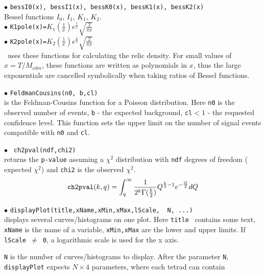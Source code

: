 \documentclass[12pt,a4paper]{article}
\begin{document}
\noindent$\bullet$ \verb|bessI0(x), bessI1(x), bessK0(x), bessK1(x), bessK2(x) |\\
 Bessel functions $I_0$, $I_1$, $K_1$, $K_2$.\\ 

\noindent$\bullet$ \verb|K1pole(x)=|$K_1(\frac{1}{x}) e^\frac{1}{x}
\sqrt{\frac{2}{\pi x}}$  \\
\noindent$\bullet$ \verb|K2pole(x)=|$K_2(\frac{1}{x}) e^\frac{1}{x}
\sqrt{\frac{2}{\pi x}}$   \\
\micro\ uses these functions for calculating the  relic density. For 
small values of $x=T/M_{cdm}$, these functions are written as polynomials in $x$, thus the large exponentials are cancelled symbolically when taking ratios 
 of  Bessel functions.  


\noindent$\bullet$ \verb|FeldmanCousins(n0, b,cl)|\\
is the Feldman-Cousins \cite{Feldman:1997qc}  function for a Poisson distribution.
Here {\tt n0} is the observed number of events, {\tt b} -  the expected background,
\verb|cl|$ < 1 $ - the requested confidence level. This function sets the upper limit on the number 
of signal events compatible with {\tt n0}  and {\tt cl}.

\noindent$\bullet$ \verb| ch2pval(ndf,chi2)|\\ 
returns the {\tt p-value} assuming a $\chi^2$ distribution with  {\tt ndf} degrees
of freedom ( expected  $\chi^2$) and {\tt chi2} is the observed $\chi^2$.  
$$   
{  \verb|ch2pval|(k,q)=\int_q^\infty  \frac{1}{2^k \Gamma(\frac{k}{2})} Q^{\frac{k}{2}-1}
e^{-\frac{Q}{2}} dQ } $$   

\noindent$\bullet$ \verb|displayPlot(title,xName,xMin,xMax,lScale,  N, ...)|\\
displays several  curves/histograms on one plot.  Here {\tt title  } contains some text, {\tt xName} is the name of a variable, 
{\tt xMin,xMax} are the lower and upper limits. If {\tt lScale $\neq$ 0}, a logarithmic scale 
is used for the x axis.


{\tt N} is the number of
curves/histograms  to display. 
 After the parameter {\tt N}, {\tt displayPlot} expects $N\times 4$ parameters, 
where each tetrad can  contain \\
\end{document}
